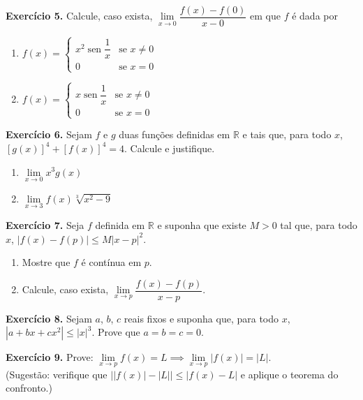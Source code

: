 \documentclass[12pt,a4paper]{article}
\begin{document}
\vspace{0.5cm}
\noindent\textbf{Exercício 5.} Calcule, caso exista, $\lim\limits_{x \to 0} \dfrac{f(x) - f(0)}{x - 0}$ em que $f$ é dada por
\begin{enumerate}
    \renewcommand{\theenumi}{\alph{enumi}}
    \renewcommand{\labelenumi}{\theenumi)}
    \item $f(x) = \begin{cases} x^2 \operatorname{sen}\dfrac{1}{x} & \text{se } x \neq 0 \\ 0 & \text{se } x = 0 \end{cases}$
    \item $f(x) = \begin{cases} x \operatorname{sen}\dfrac{1}{x} & \text{se } x \neq 0 \\ 0 & \text{se } x = 0 \end{cases}$
\end{enumerate}

\vspace{0.5cm}
\noindent\textbf{Exercício 6.} Sejam $f$ e $g$ duas funções definidas em $\mathbb{R}$ e tais que, para todo $x$, $[g(x)]^4 + [f(x)]^4 = 4$. Calcule e justifique.
\begin{enumerate}
    \renewcommand{\theenumi}{\alph{enumi}}
    \renewcommand{\labelenumi}{\theenumi)}
    \item $\lim\limits_{x \to 0} x^3 g(x)$
    \item $\lim\limits_{x \to 3} f(x)\sqrt[3]{x^2 - 9}$
\end{enumerate}

\vspace{0.5cm}
\noindent\textbf{Exercício 7.} Seja $f$ definida em $\mathbb{R}$ e suponha que existe $M > 0$ tal que, para todo $x$, $|f(x) - f(p)| \le M|x - p|^2$.
\begin{enumerate}
    \renewcommand{\theenumi}{\alph{enumi}}
    \renewcommand{\labelenumi}{\theenumi)}
    \item Mostre que $f$ é contínua em $p$.
    \item Calcule, caso exista, $\lim\limits_{x \to p} \dfrac{f(x) - f(p)}{x - p}$.
\end{enumerate}

\vspace{0.5cm}
\noindent\textbf{Exercício 8.}
Sejam $a$, $b$, $c$ reais fixos e suponha que, para todo $x$, $|a + bx + cx^2| \le |x|^3$. Prove que $a = b = c = 0$.

\vspace{0.5cm}
\noindent\textbf{Exercício 9.}
Prove: $\lim\limits_{x \to p} f(x) = L \implies \lim\limits_{x \to p} |f(x)| = |L|$.\\
(Sugestão: verifique que $\big||f(x)| - |L|\big| \le |f(x) - L|$ e aplique o teorema do confronto.)
\end{document}
